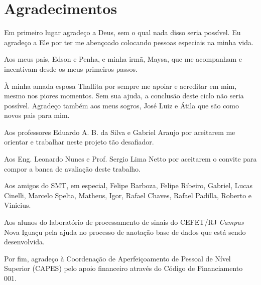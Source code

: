 \chapter*{Agradecimentos}

Em primeiro lugar agradeço a Deus, sem o qual nada disso seria possível.
Eu agradeço a Ele por ter me abençoado colocando pessoas especiais na minha vida.

Aos meus pais, Edson e Penha, e minha irmã, Maysa, que me acompanham e incentivam desde os meus primeiros passos.

À minha amada esposa Thallita por sempre me apoiar e acreditar em mim, mesmo nos piores momentos.
Sem sua ajuda, a conclusão deste ciclo não seria possível.
Agradeço também aos meus sogros, José Luiz e Átila que são como novos pais para mim.

Aos professores Eduardo A. B. da Silva e Gabriel Araujo por aceitarem me orientar e trabalhar neste projeto tão desafiador.

Aos Eng. Leonardo Nunes e Prof. Sergio Lima Netto por aceitarem o convite para compor a banca de avaliação deste trabalho.

Aos amigos do SMT, em especial, Felipe Barboza, Felipe Ribeiro, Gabriel, Lucas Cinelli, Marcelo Spelta, Matheus, Igor, Rafael Chaves, Rafael Padilla, Roberto e Vinicius. 


Aos alunos do laboratório de processamento de sinais do CEFET/RJ \textit{Campus} Nova Iguaçu
pela ajuda no processo de anotação base de dados que está sendo desenvolvida.


Por fim, agradeço à Coordenação de Aperfeiçoamento de Pessoal de Nível Superior (CAPES) pelo apoio financeiro através do Código de Financiamento 001.



